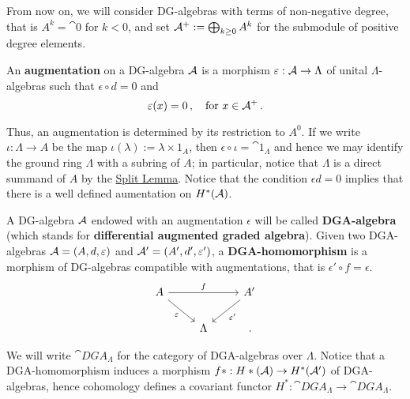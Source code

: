 	
	From now on, we will consider DG-algebras with terms of 
	non-negative degree, that is $A^{k} = \cat{0}$ for $k<0$,
	and set $\mathcal{A}^{+} := \bigoplus_{k \ge 0} A^{k}$ for the
	submodule of positive degree elements.
	
	\begin{df}
		An \textbf{augmentation} on a DG-algebra $\mathcal{A}$
		is a morphism $\varepsilon : \mathcal{A} \to \Lambda$
		of unital $\Lambda$-algebras such that $\epsilon \circ d = 0$ and
		\begin{equation*}
			\varepsilon(x) = 0\,, \quad \text{for }
			x \in \mathcal{A}^{+}\,.
		\end{equation*}
	\end{df}
	
	Thus, an augmentation is determined by its restriction to $A^{0}$.
	If we write $\iota : \Lambda \to A$ be the map
	$\iota(\lambda) := \lambda \times 1_{A}$, 
	then $\epsilon \circ \iota = \cat{1}_{\Lambda}$ and hence
	we may identify the ground ring $\Lambda$ with a subring of $A$;
	in particular, notice that $\Lambda$ is a direct summand of $A$
	by the \hyperref[split-lemma]{Split Lemma}.
	Notice that the condition $\epsilon d = 0$ implies
	that there is a well defined aumentation on $H^*(\mathcal{A})$.
	
	
	\begin{df}
		A DG-algebra $\mathcal{A}$ endowed with an augmentation $\epsilon$
		will be called \textbf{DGA-algebra} 
		(which stands for \textbf{differential augmented graded algebra}).
		Given two DGA-algebras 
		$\mathcal{A} = (A,d,\varepsilon)$ and $\mathcal{A}' = (A',d',\varepsilon')$,
		a \textbf{DGA-homomorphism} is a morphism
		of DG-algebras compatible with augmentations,
		that is $\epsilon' \circ f = \epsilon$.
		\begin{equation*}
			\begin{tikzcd}
				A \ar[rr, "f"] \ar[dr, "\epsilon"'] & & A' \ar[dl, "\epsilon'"] \\
				& \Lambda & \,.
			\end{tikzcd}
		\end{equation*}
	\end{df}
	
	We will write $\cat{DGA}_{\Lambda}$ for the category of
	DGA-algebras over $\Lambda$.
	Notice that a DGA-homomorphism induces a morphism $f*:H*(\mathcal{A}) \to H^*(\mathcal{A}')$
	of DGA-algebras, hence cohomology defines a covariant functor
	$H^*:\cat{DGA}_{\Lambda} \to \cat{DGA}_{\Lambda}$.
	
